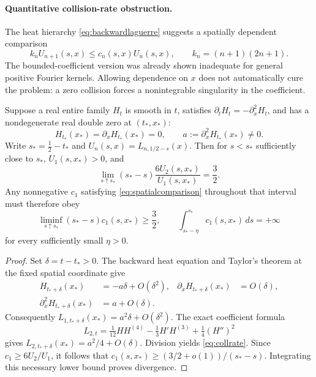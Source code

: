 \paragraph{Quantitative collision-rate obstruction.}
\label{sec:collisionrate}
The heat hierarchy \eqref{eq:backwardlaguerre} suggests a
spatially dependent comparison
\begin{equation}\label{eq:spatialcomparison}
k_n U_{n+1}(s,x)\le c_n(s,x)U_n(s,x),
\qquad k_n=(n+1)(2n+1).
\end{equation}
The bounded-coefficient version was already shown inadequate
for general positive Fourier kernels. Allowing dependence on
$x$ does not automatically cure the problem: a zero collision
forces a nonintegrable singularity in the coefficient.

\begin{theorem}
\label{thm:collisionrate}
Suppose a real entire family $H_t$ is smooth in $t$,
satisfies $\partial_tH_t=-\partial_x^2H_t$, and has a
nondegenerate real double zero at $(t_*,x_*)$:
\[
H_{t_*}(x_*)=\partial_xH_{t_*}(x_*)=0,
\qquad a:=\partial_x^2H_{t_*}(x_*)\ne0.
\]
Write $s_*=\tfrac12-t_*$ and
$U_n(s,x)=L_{n,1/2-s}(x)$. Then for $s<s_*$
sufficiently close to $s_*$, $U_1(s,x_*)>0$,
and
\begin{equation}\label{eq:collrate}
\boxed{\lim_{s\uparrow s_*}
(s_*-s)\frac{6U_2(s,x_*)}{U_1(s,x_*)}
=\frac32.}
\end{equation}
Any nonnegative $c_1$ satisfying \eqref{eq:spatialcomparison}
throughout that interval must therefore obey
\[
\liminf_{s\uparrow s_*}(s_*-s)c_1(s,x_*)
\ge\frac32,\qquad
\int_{s_*-\eta}^{s_*}c_1(s,x_*)\,ds=+\infty
\]
for every sufficiently small $\eta>0$.
\end{theorem}
\begin{proof}
Set $\delta=t-t_*>0$. The backward heat equation
and Taylor's theorem at the fixed spatial coordinate give
\[
\begin{aligned}
H_{t_*+\delta}(x_*)&=-a\delta+O(\delta^2),&
\partial_xH_{t_*+\delta}(x_*)&=O(\delta),\\
\partial_x^2H_{t_*+\delta}(x_*)&=a+O(\delta).
\end{aligned}
\]
Consequently
$L_{1,t_*+\delta}(x_*)=a^2\delta+O(\delta^2)$.
The exact coefficient formula
\[
L_{2,t}
=\tfrac1{12}HH^{(4)}
-\tfrac13H'H^{(3)}
+\tfrac14(H'')^2
\]
gives $L_{2,t_*+\delta}(x_*)=a^2/4+O(\delta)$.
Division yields \eqref{eq:collrate}.
Since $c_1\ge6U_2/U_1$, it follows that
$c_1(s,x_*)\ge(3/2+o(1))/(s_*-s)$.
Integrating this necessary lower bound proves divergence.
\end{proof}


